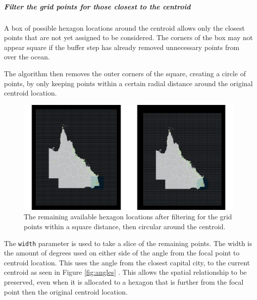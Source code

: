 \hypertarget{filter-the-grid-points-for-those-closest-to-the-centroid}{%
\subparagraph{Filter the grid points for those closest to the
centroid}\label{filter-the-grid-points-for-those-closest-to-the-centroid}}

A box of possible hexagon locations around the centroid allows only the
closest points that are not yet assigned to be considered. The corners
of the box may not appear square if the buffer step has already removed
unnecessary points from over the ocean.

The algorithm then removes the outer corners of the square, creating a
circle of points, by only keeping points within a certain radial
distance around the original centroid location.

\begin{figure}[h]
\centering
\includegraphics[width=16cm]{figs/4grid.png}
\caption{\label{fig:buffers}The remaining available hexagon locations after filtering for the grid points within a square distance, then circular around the centroid.}
\end{figure}

The \texttt{width} parameter is used to take a slice of the remaining
points. The width is the amount of degrees used on either side of the
angle from the focal point to centroid location. This uses the angle
from the closest capital city, to the current centroid as seen in Figure
\ref{fig:angles} . This allows the spatial relationship to be preserved,
even when it is allocated to a hexagon that is further from the focal
point then the original centroid location.

